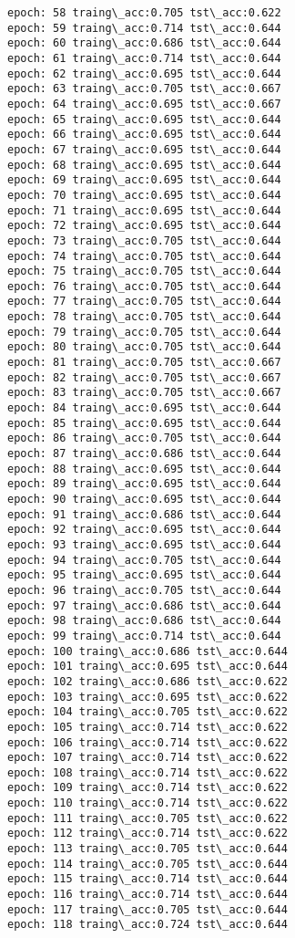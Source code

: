 \documentclass[11pt]{article}
\begin{document}
\begin{Verbatim}[commandchars=\\\{\}]
epoch: 58 traing\_acc:0.705 tst\_acc:0.622
epoch: 59 traing\_acc:0.714 tst\_acc:0.644
epoch: 60 traing\_acc:0.686 tst\_acc:0.644
epoch: 61 traing\_acc:0.714 tst\_acc:0.644
epoch: 62 traing\_acc:0.695 tst\_acc:0.644
epoch: 63 traing\_acc:0.705 tst\_acc:0.667
epoch: 64 traing\_acc:0.695 tst\_acc:0.667
epoch: 65 traing\_acc:0.695 tst\_acc:0.644
epoch: 66 traing\_acc:0.695 tst\_acc:0.644
epoch: 67 traing\_acc:0.695 tst\_acc:0.644
epoch: 68 traing\_acc:0.695 tst\_acc:0.644
epoch: 69 traing\_acc:0.695 tst\_acc:0.644
epoch: 70 traing\_acc:0.695 tst\_acc:0.644
epoch: 71 traing\_acc:0.695 tst\_acc:0.644
epoch: 72 traing\_acc:0.695 tst\_acc:0.644
epoch: 73 traing\_acc:0.705 tst\_acc:0.644
epoch: 74 traing\_acc:0.705 tst\_acc:0.644
epoch: 75 traing\_acc:0.705 tst\_acc:0.644
epoch: 76 traing\_acc:0.705 tst\_acc:0.644
epoch: 77 traing\_acc:0.705 tst\_acc:0.644
epoch: 78 traing\_acc:0.705 tst\_acc:0.644
epoch: 79 traing\_acc:0.705 tst\_acc:0.644
epoch: 80 traing\_acc:0.705 tst\_acc:0.644
epoch: 81 traing\_acc:0.705 tst\_acc:0.667
epoch: 82 traing\_acc:0.705 tst\_acc:0.667
epoch: 83 traing\_acc:0.705 tst\_acc:0.667
epoch: 84 traing\_acc:0.695 tst\_acc:0.644
epoch: 85 traing\_acc:0.695 tst\_acc:0.644
epoch: 86 traing\_acc:0.705 tst\_acc:0.644
epoch: 87 traing\_acc:0.686 tst\_acc:0.644
epoch: 88 traing\_acc:0.695 tst\_acc:0.644
epoch: 89 traing\_acc:0.695 tst\_acc:0.644
epoch: 90 traing\_acc:0.695 tst\_acc:0.644
epoch: 91 traing\_acc:0.686 tst\_acc:0.644
epoch: 92 traing\_acc:0.695 tst\_acc:0.644
epoch: 93 traing\_acc:0.695 tst\_acc:0.644
epoch: 94 traing\_acc:0.705 tst\_acc:0.644
epoch: 95 traing\_acc:0.695 tst\_acc:0.644
epoch: 96 traing\_acc:0.705 tst\_acc:0.644
epoch: 97 traing\_acc:0.686 tst\_acc:0.644
epoch: 98 traing\_acc:0.686 tst\_acc:0.644
epoch: 99 traing\_acc:0.714 tst\_acc:0.644
epoch: 100 traing\_acc:0.686 tst\_acc:0.644
epoch: 101 traing\_acc:0.695 tst\_acc:0.644
epoch: 102 traing\_acc:0.686 tst\_acc:0.622
epoch: 103 traing\_acc:0.695 tst\_acc:0.622
epoch: 104 traing\_acc:0.705 tst\_acc:0.622
epoch: 105 traing\_acc:0.714 tst\_acc:0.622
epoch: 106 traing\_acc:0.714 tst\_acc:0.622
epoch: 107 traing\_acc:0.714 tst\_acc:0.622
epoch: 108 traing\_acc:0.714 tst\_acc:0.622
epoch: 109 traing\_acc:0.714 tst\_acc:0.622
epoch: 110 traing\_acc:0.714 tst\_acc:0.622
epoch: 111 traing\_acc:0.705 tst\_acc:0.622
epoch: 112 traing\_acc:0.714 tst\_acc:0.622
epoch: 113 traing\_acc:0.705 tst\_acc:0.644
epoch: 114 traing\_acc:0.705 tst\_acc:0.644
epoch: 115 traing\_acc:0.714 tst\_acc:0.644
epoch: 116 traing\_acc:0.714 tst\_acc:0.644
epoch: 117 traing\_acc:0.705 tst\_acc:0.644
epoch: 118 traing\_acc:0.724 tst\_acc:0.644

\end{Verbatim}
\end{document}
